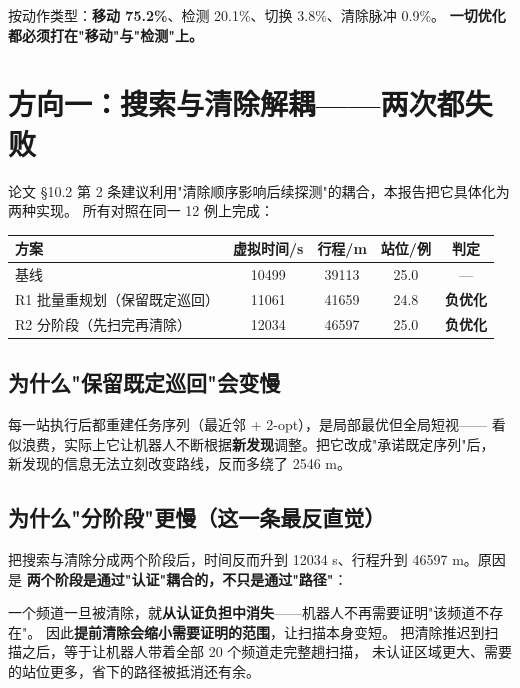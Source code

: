 按动作类型：\textbf{移动 75.2\%}、检测 20.1\%、切换 3.8\%、清除脉冲 0.9\%。
\textbf{一切优化都必须打在"移动"与"检测"上。}

\section{方向一：搜索与清除解耦——两次都失败}

论文 §10.2 第 2 条建议利用"清除顺序影响后续探测"的耦合，本报告把它具体化为两种实现。
所有对照在同一 12 例上完成：

\begin{center}
\begin{tabular}{lcccc}
\toprule
方案 & 虚拟时间/s & 行程/m & 站位/例 & 判定 \\ \midrule
基线 & 10499 & 39113 & 25.0 & --- \\
R1 批量重规划（保留既定巡回） & 11061 & 41659 & 24.8 & \textbf{负优化} \\
R2 分阶段（先扫完再清除） & 12034 & 46597 & 25.0 & \textbf{负优化} \\
\bottomrule
\end{tabular}
\end{center}

\subsection{为什么"保留既定巡回"会变慢}

每一站执行后都重建任务序列（最近邻 + 2-opt），是局部最优但全局短视——
看似浪费，实际上它让机器人不断根据\textbf{新发现}调整。把它改成"承诺既定序列"后，
新发现的信息无法立刻改变路线，反而多绕了 2546 m。

\subsection{为什么"分阶段"更慢（这一条最反直觉）}

把搜索与清除分成两个阶段后，时间反而升到 12034 s、行程升到 46597 m。原因是
\textbf{两个阶段是通过"认证"耦合的，不只是通过"路径"}：

\begin{keybox}[title=关键机制]
一个频道一旦被清除，就\textbf{从认证负担中消失}——机器人不再需要证明"该频道不存在"。
因此\textbf{提前清除会缩小需要证明的范围}，让扫描本身变短。
把清除推迟到扫描之后，等于让机器人带着全部 20 个频道走完整趟扫描，
未认证区域更大、需要的站位更多，省下的路径被抵消还有余。
\end{keybox}

